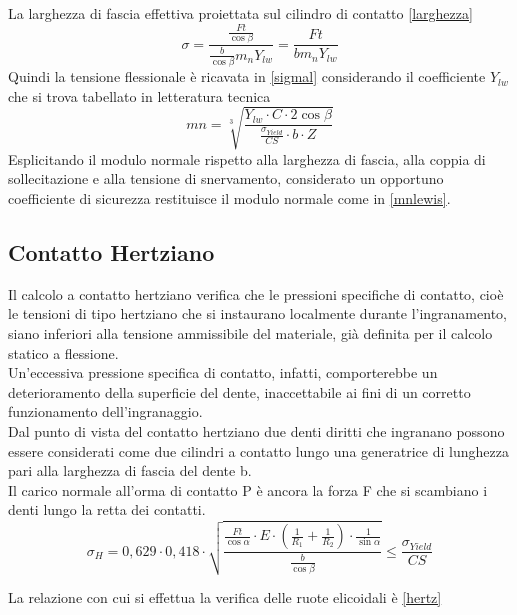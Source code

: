 \documentclass[%
corpo=11pt,
twoside,
 stile=classica,
oldstyle,
greek,%
]{toptesi}
\begin{document}
	La larghezza di fascia effettiva proiettata sul cilindro di contatto \ref{larghezza}
	\begin{equation}\label{sigmal}
	\sigma=\frac{\frac{Ft}{\cos\beta}}{\frac{b}{\cos\beta}m_{n}Y_{lw}}=\frac{Ft}{b m_{n}Y_{lw}}
	\end{equation}
	Quindi la tensione flessionale è ricavata in \ref{sigmal} considerando il coefficiente $Y_{lw}$ che si trova tabellato in letteratura tecnica
		\begin{equation}\label{mnlewis}
	mn=\sqrt[3]{\frac{Y_{lw} \cdot C \cdot 2 \cos\beta}{\frac{\sigma_{Yield}}{CS} \cdot b \cdot Z}}
	\end{equation}
	Esplicitando il modulo normale rispetto alla larghezza di fascia, alla coppia di sollecitazione e alla tensione di snervamento, considerato un opportuno coefficiente di sicurezza restituisce il modulo normale come in \ref{mnlewis}.
	\subsection{Contatto Hertziano}
	Il calcolo a contatto hertziano verifica che le pressioni specifiche di contatto, cioè le tensioni di tipo hertziano che si instaurano localmente durante l’ingranamento, siano inferiori alla tensione ammissibile del materiale, già definita per il calcolo statico a flessione.\\
	Un’eccessiva pressione specifica di contatto, infatti, comporterebbe un deterioramento della superficie del dente, inaccettabile ai fini di un corretto funzionamento dell’ingranaggio.\\
	Dal punto di vista del contatto hertziano due denti diritti che ingranano possono essere considerati come due cilindri a contatto lungo una generatrice di lunghezza pari alla larghezza di fascia del dente b. \\
	Il carico normale all’orma di contatto P è ancora la forza F che si scambiano i denti lungo la retta dei contatti. 
	\begin{equation}\label{hertz}
	\sigma_{H}=0,629\cdot0,418\cdot\sqrt{\frac{\frac{Ft}{\cos\alpha}\cdot E\cdot(\frac{1}{R_{1}}+\frac{1}{R_{2}})\cdot \frac{1}{\sin\alpha}}{\frac{b}{\cos\beta}}}\leq \frac{\sigma_{Yield}}{CS}
	\end{equation}
	
	La relazione con cui si effettua la verifica delle ruote elicoidali è \ref{hertz}
	
\end{document}
